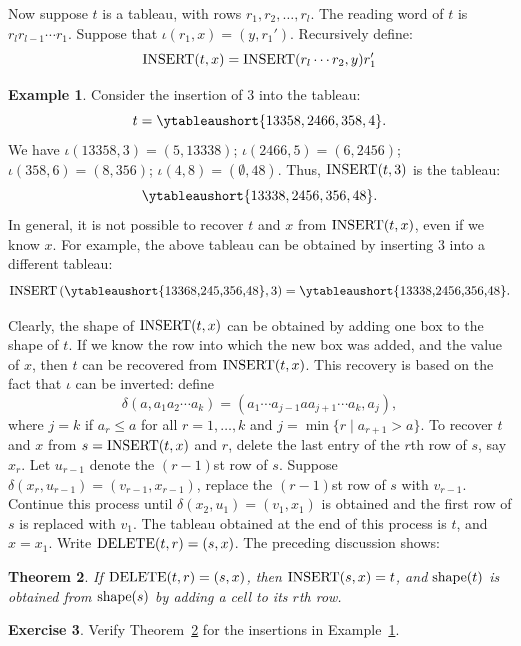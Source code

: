 \documentclass[11pt]{amsart}
\newtheorem{theorem}{Theorem}[subsection]
\theoremstyle{definition}
\theoremstyle{example}
\newtheorem{example}[theorem]{Example}
\newtheorem{exercise}[theorem]{Exercise}
\newcommand{\rins}{\iota}
\newcommand{\ins}{\textup{INSERT}}
\newcommand{\del}{\textup{DELETE}}
\newcommand{\rdel}{\delta}
\newcommand{\shape}{\textup{shape}}
\begin{document}
Now suppose $t$ is a tableau, with rows $r_1,r_2,\dotsc, r_l$.
The reading word of $t$ is $r_l r_{l-1} \dotsb r_1$.
Suppose that $\rins(r_1,x) = (y, r_1')$.
Recursively define:
\begin{displaymath}
  \ins(t, x) = \ins(r_l \dotsb r_2, y) r_1'
\end{displaymath}
\begin{example}
  \label{example:insertion}
  Consider the insertion of $3$ into the tableau:
  \begin{displaymath}
    t = \ytableaushort{13358,2466,358,4}.
  \end{displaymath}
  We have $\rins(13358,3) = (5,13338)$; $\rins(2466,5)=(6,2456)$; $\rins(358,6)=(8,356)$; $\rins(4,8)=(\emptyset,48)$.
  Thus, $\ins(t, 3)$ is the tableau:
  \begin{displaymath}
    \ytableaushort{13338,2456,356,48}.
  \end{displaymath}
In general, it is not possible to recover $t$ and $x$ from $\ins(t,x)$, even if we know $x$.
For example, the above tableau can be obtained by inserting $3$ into a different tableau:
\begin{displaymath}
  \ins\left(\vcenter{\hbox{\ytableaushort{13368,245,356,48}}}, 3\right) = \vcenter{\hbox{\ytableaushort{13338,2456,356,48}}}.
\end{displaymath}
\end{example}
Clearly, the shape of $\ins(t,x)$ can be obtained by adding one box to the shape of $t$.
If we know the row into which the new box was added, and the value of $x$, then $t$ can be recovered from $\ins(t,x)$.
This recovery is based on the fact that $\rins$ can be inverted:
define
\begin{displaymath}
  \rdel(a, a_1a_2\dotsb a_k) = (a_1\dotsb a_{j-1}aa_{j+1}\dotsb a_k, a_j),
\end{displaymath}
where $j=k$ if $a_r\leq a$ for all $r=1,\dotsc, k$ and $j = \min\{r\mid a_{r+1}>a\}$.
To recover $t$ and $x$ from $s=\ins(t,x)$ and $r$, delete the last entry of the $r$th row of $s$, say $x_r$.
Let $u_{r-1}$ denote the $(r-1)$st row of $s$.
Suppose $\rdel(x_r,u_{r-1}) = (v_{r-1},x_{r-1})$, replace the $(r-1)$st row of $s$ with $v_{r-1}$.
Continue this process until $\rdel(x_2,u_1)=(v_1,x_1)$ is obtained and the first row of $s$ is replaced with $v_1$.
The tableau obtained at the end of this process is $t$, and $x=x_1$.
Write $\del(t,r)=(s,x)$.
The preceding discussion shows:
\begin{theorem}
  \label{theorem:del-ins}
  If $\del(t,r)=(s,x)$, then $\ins(s,x)=t$, and $\shape(t)$ is obtained from $\shape(s)$ by adding a cell to its $r$th row.
\end{theorem}
\begin{exercise}
  Verify Theorem~\ref{theorem:del-ins} for the insertions in Example~\ref{example:insertion}.
\end{exercise}
\end{document}
